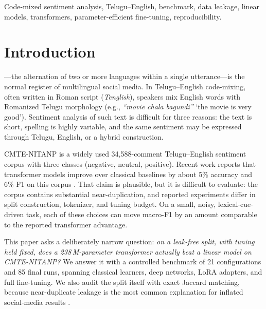 \documentclass[10pt,journal]{IEEEtran}
\begin{document}
\begin{IEEEkeywords}
Code-mixed sentiment analysis, Telugu--English, benchmark, data leakage, linear models, transformers, parameter-efficient fine-tuning, reproducibility.
\end{IEEEkeywords}

\section{Introduction}
---the alternation of two or more languages within a single utterance---is the normal register of multilingual social media. In Telugu--English code-mixing, often written in Roman script (\emph{Tenglish}), speakers mix English words with Romanized Telugu morphology (e.g., \textit{``movie chala bagundi''} `the movie is very good'). Sentiment analysis of such text is difficult for three reasons: the text is short, spelling is highly variable, and the same sentiment may be expressed through Telugu, English, or a hybrid construction.

CMTE-NITANP \cite{rayala2026} is a widely used 34{,}588-comment Telugu--English sentiment corpus with three classes (negative, neutral, positive). Recent work reports that transformer models improve over classical baselines by about 5\% accuracy and 6\% F1 on this corpus \cite{rayala2026}. That claim is plausible, but it is difficult to evaluate: the corpus contains substantial near-duplication, and reported experiments differ in split construction, tokenizer, and tuning budget. On a small, noisy, lexical-cue-driven task, each of these choices can move macro-F1 by an amount comparable to the reported transformer advantage.

This paper asks a deliberately narrow question: \emph{on a leak-free split, with tuning held fixed, does a 238\,M-parameter transformer actually beat a linear model on CMTE-NITANP?} We answer it with a controlled benchmark of 21 configurations and 85 final runs, spanning classical learners, deep networks, LoRA adapters, and full fine-tuning. We also audit the split itself with exact Jaccard matching, because near-duplicate leakage is the most common explanation for inflated social-media results \cite{kaufman2012}.
\end{document}
